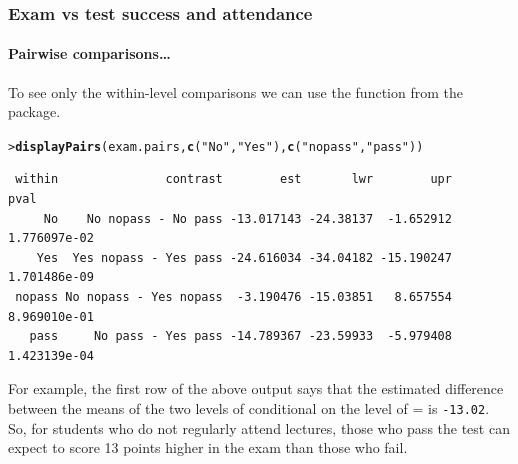 \documentclass{beamer}\usepackage[]{graphicx}\usepackage[]{xcolor}
\makeatletter
\newcommand{\hlstr}[1]{\textcolor[rgb]{0.192,0.494,0.8}{#1}}%
\newcommand{\hlstd}[1]{\textcolor[rgb]{0.345,0.345,0.345}{#1}}%
\newcommand{\hlkwd}[1]{\textcolor[rgb]{0.737,0.353,0.396}{\textbf{#1}}}%
\newenvironment{kframe}{%
 \def\at@end@of@kframe{}%
 \ifinner\ifhmode%
  \def\at@end@of@kframe{\end{minipage}}%
  \begin{minipage}{\columnwidth}%
 \fi\fi%
 \def\FrameCommand##1{\hskip\@totalleftmargin \hskip-\fboxsep
 \colorbox{shadecolor}{##1}\hskip-\fboxsep
     \hskip-\linewidth \hskip-\@totalleftmargin \hskip\columnwidth}%
 \MakeFramed {\advance\hsize-\width
   \@totalleftmargin\z@ \linewidth\hsize
   \@setminipage}}%
 {\par\unskip\endMakeFramed%
 \at@end@of@kframe}
\newenvironment{knitrout}{}{} %
\makeatother
\begin{document}
\begin{frame}[fragile, label={frame:refcell_intn_coeffs}]
\frametitle{Exam vs test success and attendance}
\framesubtitle{Pairwise comparisons\ldots}

To see only the within-level comparisons we can use the
 function from the  package.
\bigskip

\begin{knitrout}\scriptsize
{}\color{fgcolor}\begin{kframe}
\begin{alltt}
\hlstd{> }\hlkwd{displayPairs}\hlstd{(exam.pairs,} \hlkwd{c}\hlstd{(}\hlstr{"No"}\hlstd{,}\hlstr{"Yes"}\hlstd{),} \hlkwd{c}\hlstd{(}\hlstr{"nopass"}\hlstd{,}\hlstr{"pass"}\hlstd{))}
\end{alltt}
\end{kframe}
\end{knitrout}



\begin{knitrout}\scriptsize
{}\color{fgcolor}\begin{kframe}
\begin{verbatim}
 within               contrast        est       lwr        upr         pval
     No    No nopass - No pass -13.017143 -24.38137  -1.652912 1.776097e-02
    Yes  Yes nopass - Yes pass -24.616034 -34.04182 -15.190247 1.701486e-09
 nopass No nopass - Yes nopass  -3.190476 -15.03851   8.657554 8.969010e-01
   pass     No pass - Yes pass -14.789367 -23.59933  -5.979408 1.423139e-04
\end{verbatim}
\end{kframe}
\end{knitrout}

For example, the first row of the above output says that the estimated difference between the means of the two levels of  conditional on the level of  =  is \texttt{-13.02}. So, for students who do not regularly attend lectures, those who pass the test can expect to score 13 points higher in the exam than those who fail.
\end{frame}
\end{document}
